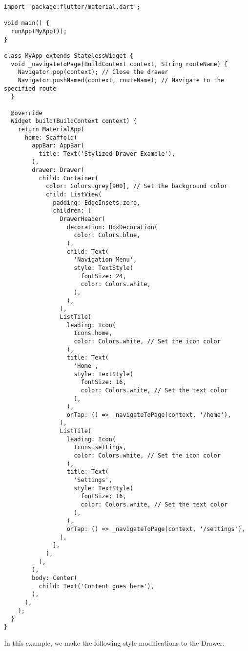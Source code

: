 \begin{lstlisting}
import 'package:flutter/material.dart';

void main() {
  runApp(MyApp());
}

class MyApp extends StatelessWidget {
  void _navigateToPage(BuildContext context, String routeName) {
    Navigator.pop(context); // Close the drawer
    Navigator.pushNamed(context, routeName); // Navigate to the specified route
  }

  @override
  Widget build(BuildContext context) {
    return MaterialApp(
      home: Scaffold(
        appBar: AppBar(
          title: Text('Stylized Drawer Example'),
        ),
        drawer: Drawer(
          child: Container(
            color: Colors.grey[900], // Set the background color
            child: ListView(
              padding: EdgeInsets.zero,
              children: [
                DrawerHeader(
                  decoration: BoxDecoration(
                    color: Colors.blue,
                  ),
                  child: Text(
                    'Navigation Menu',
                    style: TextStyle(
                      fontSize: 24,
                      color: Colors.white,
                    ),
                  ),
                ),
                ListTile(
                  leading: Icon(
                    Icons.home,
                    color: Colors.white, // Set the icon color
                  ),
                  title: Text(
                    'Home',
                    style: TextStyle(
                      fontSize: 16,
                      color: Colors.white, // Set the text color
                    ),
                  ),
                  onTap: () => _navigateToPage(context, '/home'),
                ),
                ListTile(
                  leading: Icon(
                    Icons.settings,
                    color: Colors.white, // Set the icon color
                  ),
                  title: Text(
                    'Settings',
                    style: TextStyle(
                      fontSize: 16,
                      color: Colors.white, // Set the text color
                    ),
                  ),
                  onTap: () => _navigateToPage(context, '/settings'),
                ),
              ],
            ),
          ),
        ),
        body: Center(
          child: Text('Content goes here'),
        ),
      ),
    );
  }
}
\end{lstlisting}

In this example, we make the following style modifications to the Drawer:

